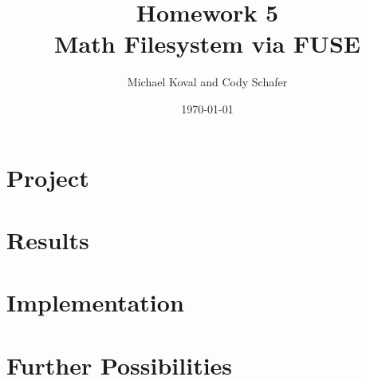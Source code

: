 \documentclass[10pt]{article}
\title{\textbf{Homework 5}\\
Math Filesystem via FUSE}
\author{Michael Koval and Cody Schafer}
\date{\today}
\begin{document}
\maketitle

\section{Project}

\section{Results}

\section{Implementation}

\section{Further Possibilities}
\end{document}
